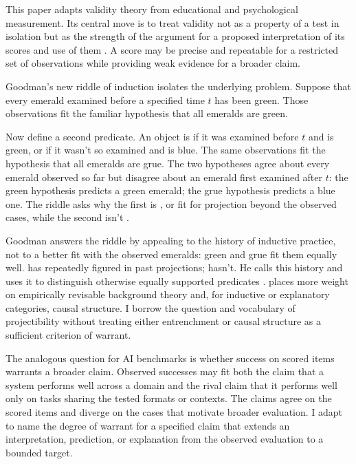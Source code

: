 \documentclass[12pt]{article}
\begin{document}
This paper adapts validity theory from educational and psychological measurement. Its central move is to treat validity not as a property of a test in isolation but as the strength of the argument for a proposed interpretation of its scores and use of them \citep{messick1995Validity,kane2013validating}. A score may be precise and repeatable for a restricted set of observations while providing weak evidence for a broader claim.

Goodman's new riddle of induction isolates the underlying problem. Suppose that every emerald examined before a specified time \(t\) has been green. Those observations fit the familiar hypothesis that all emeralds are green.

Now define a second predicate. An object is  if it was examined before \(t\) and is green, or if it wasn't so examined and is blue. The same observations fit the hypothesis that all emeralds are grue. The two hypotheses agree about every emerald observed so far but disagree about an emerald first examined after \(t\): the green hypothesis predicts a green emerald; the grue hypothesis predicts a blue one. The riddle asks why the first is , or fit for projection beyond the observed cases, while the second isn't \citep[74--80]{goodman1983}.

Goodman answers the riddle by appealing to the history of inductive practice, not to a better fit with the observed emeralds: green and grue fit them equally well.  has repeatedly figured in past projections;  hasn't. He calls this history  and uses it to distinguish otherwise equally supported predicates \citep[84--86, 93--98]{goodman1983}. \Textcite[136--141]{boyd1991} places more weight on empirically revisable background theory and, for inductive or explanatory categories, causal structure. I borrow the question and vocabulary of projectibility without treating either entrenchment or causal structure as a sufficient criterion of warrant.

The analogous question for AI benchmarks is whether success on scored items warrants a broader claim. Observed successes may fit both the claim that a system performs well across a domain and the rival claim that it performs well only on tasks sharing the tested formats or contexts. The claims agree on the scored items and diverge on the cases that motivate broader evaluation. I adapt  to name the degree of warrant for a specified claim that extends an interpretation, prediction, or explanation from the observed evaluation to a bounded target.
\end{document}
